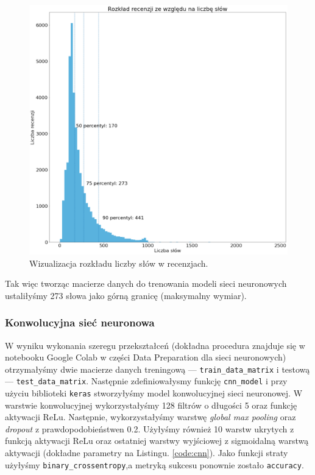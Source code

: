 \begin{figure}[H]
	\centering
	\includegraphics[width=0.75\linewidth]{images/chapter3/w2v-percentyle.pdf}
	\caption{Wizualizacja rozkładu liczby słów w recenzjach.}
	\label{fig:w2v-percentyle}
\end{figure}

\noindent Tak więc tworząc macierze danych do trenowania modeli sieci neuronowych ustaliłyśmy 273 słowa jako górną granicę (maksymalny wymiar).

\subsubsection{Konwolucyjna sieć neuronowa}

\noindent W wyniku wykonania szeregu przekształceń (dokładna procedura znajduje się w notebooku Google Colab w części Data Preparation dla sieci neuronowych) otrzymałyśmy dwie macierze danych treningową --- \verb|train_data_matrix| i testową --- \verb|test_data_matrix|.
Następnie zdefiniowałysmy funkcję \verb|cnn_model| i przy użyciu biblioteki \verb|keras| stworzyłyśmy model konwolucyjnej sieci neuronowej. W warstwie konwolucyjnej wykorzystałyśmy 128 filtrów o długości 5 oraz funkcję aktywacji ReLu. Następnie, wykorzystałyśmy warstwę \textit{global max pooling} oraz \textit{dropout} z prawdopodobieństwen 0.2.  Użyłyśmy również 10 warstw ukrytych z funkcją aktywacji ReLu oraz ostatniej warstwy wyjściowej z sigmoidalną warstwą aktywacji (dokładne parametry na Listingu. \ref{code:cnn}). Jako funkcji straty użyłyśmy \verb|binary_crossentropy|,a metryką sukcesu ponownie zostało \verb|accuracy|.

